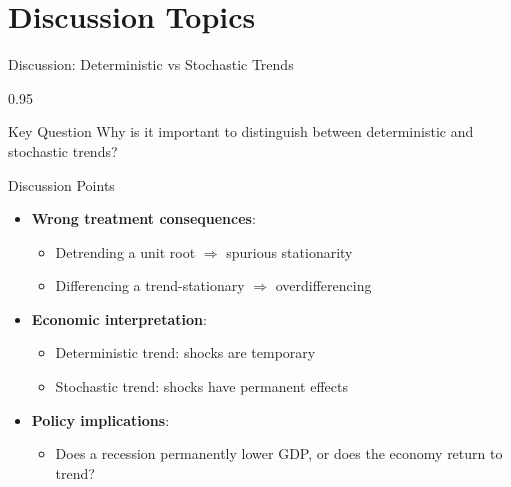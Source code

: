 \documentclass[9pt, aspectratio=169, t]{beamer}
\begin{document}
\section{Discussion Topics}

\begin{frame}{Discussion: Deterministic vs Stochastic Trends}
    \begin{cminipage}{0.95\textwidth}
    \begin{block}{Key Question}
        Why is it important to distinguish between deterministic and stochastic trends?
    \end{block}

    \vspace{0.3cm}

    \begin{block}{Discussion Points}
        \begin{itemize}\setlength{\itemsep}{0pt}
            \item \textbf{Wrong treatment consequences}:
                \begin{itemize}\setlength{\itemsep}{0pt}
                    \item Detrending a unit root $\Rightarrow$ spurious stationarity
                    \item Differencing a trend-stationary $\Rightarrow$ overdifferencing
                \end{itemize}
            \item \textbf{Economic interpretation}:
                \begin{itemize}\setlength{\itemsep}{0pt}
                    \item Deterministic trend: shocks are temporary
                    \item Stochastic trend: shocks have permanent effects
                \end{itemize}
            \item \textbf{Policy implications}:
                \begin{itemize}\setlength{\itemsep}{0pt}
                    \item Does a recession permanently lower GDP, or does the economy return to trend?
                \end{itemize}
        \end{itemize}
    \end{block}
    \end{cminipage}
\end{frame}
\end{document}
